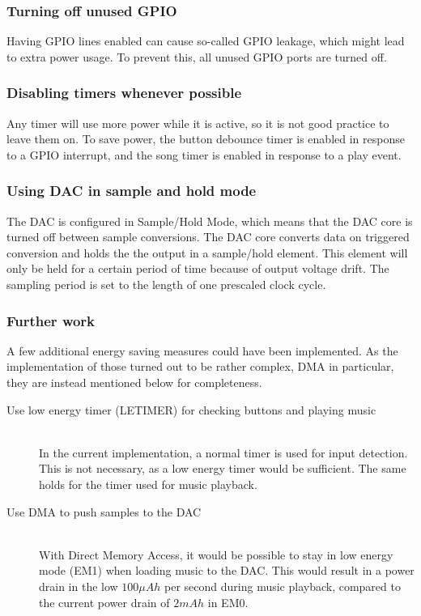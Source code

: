 \subsubsection{Turning off unused GPIO}
Having GPIO lines enabled can cause so-called GPIO leakage, which might lead to extra power usage.
To prevent this, all unused GPIO ports are turned off.

\subsubsection{Disabling timers whenever possible}
Any timer will use more power while it is active, so it is not good practice to leave them on.
To save power, the button debounce timer is enabled in response to a GPIO interrupt, and the song timer is enabled in response to a play event. 

\subsubsection{Using DAC in sample and hold mode}
The DAC is configured in Sample/Hold Mode, which means that the DAC core is turned off between sample conversions.
The DAC core converts data on triggered conversion and holds the the output in a sample/hold element.
This element will only be held for a certain period of time because of output voltage drift.
The sampling period is set to the length of one prescaled clock cycle.

\subsubsection{Further work}
A few additional energy saving measures could have been implemented.
As the implementation of those turned out to be rather complex, DMA in particular, they are instead mentioned below for completeness.

\begin{description}
  \item[Use low energy timer (LETIMER) for checking buttons and playing music] \hfill \\
        In the current implementation, a normal timer is used for input detection. This is not necessary, as a low energy timer would be sufficient. The same holds for the timer used for music playback.
  \item[Use DMA to push samples to the DAC] \hfill \\ \label{DMA} 
      With Direct Memory Access, it would be possible to stay in low energy mode (EM1) when loading music to the DAC. This would result in a power drain in the low $ 100 \mu Ah $ per second during music playback, compared to the current power drain of $ 2 mAh $ in EM0.
\end{description}



